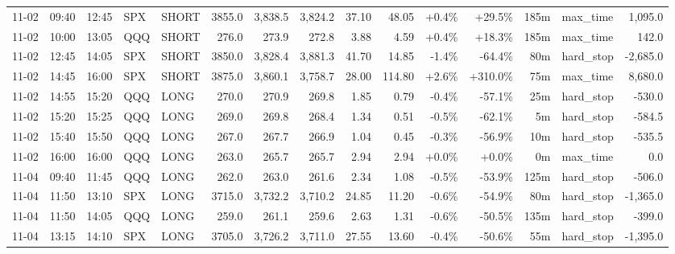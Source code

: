 \documentclass[11pt,a4paper,twoside]{article}
\begin{document}
\begin{landscape}
\begin{center}
\begin{longtable}{>{\color{txtmain}}l l l l l r r r r r r r r >{\color{txtmain}}l r}
11-02 & 09:40 & 12:45 & SPX & SHORT & 3855.0 & 3,838.5 & 3,824.2 & 37.10 & 48.05 & \textcolor{wingreen}{+0.4\%} & \textcolor{wingreen}{+29.5\%} & 185m & max\_time & \textcolor{wingreen}{1,095.0} \\
11-02 & 10:00 & 13:05 & QQQ & SHORT & 276.0 & 273.9 & 272.8 & 3.88 & 4.59 & \textcolor{wingreen}{+0.4\%} & \textcolor{wingreen}{+18.3\%} & 185m & max\_time & \textcolor{wingreen}{142.0} \\
11-02 & 12:45 & 14:05 & SPX & SHORT & 3850.0 & 3,828.4 & 3,881.3 & 41.70 & 14.85 & \textcolor{lossred}{-1.4\%} & \textcolor{lossred}{-64.4\%} & 80m & hard\_stop & \textcolor{lossred}{-2,685.0} \\
11-02 & 14:45 & 16:00 & SPX & SHORT & 3875.0 & 3,860.1 & 3,758.7 & 28.00 & 114.80 & \textcolor{wingreen}{+2.6\%} & \textcolor{wingreen}{+310.0\%} & 75m & max\_time & \textcolor{wingreen}{8,680.0} \\
11-02 & 14:55 & 15:20 & QQQ & LONG & 270.0 & 270.9 & 269.8 & 1.85 & 0.79 & \textcolor{lossred}{-0.4\%} & \textcolor{lossred}{-57.1\%} & 25m & hard\_stop & \textcolor{lossred}{-530.0} \\
11-02 & 15:20 & 15:25 & QQQ & LONG & 269.0 & 269.8 & 268.4 & 1.34 & 0.51 & \textcolor{lossred}{-0.5\%} & \textcolor{lossred}{-62.1\%} & 5m & hard\_stop & \textcolor{lossred}{-584.5} \\
11-02 & 15:40 & 15:50 & QQQ & LONG & 267.0 & 267.7 & 266.9 & 1.04 & 0.45 & \textcolor{lossred}{-0.3\%} & \textcolor{lossred}{-56.9\%} & 10m & hard\_stop & \textcolor{lossred}{-535.5} \\
11-02 & 16:00 & 16:00 & QQQ & LONG & 263.0 & 265.7 & 265.7 & 2.94 & 2.94 & \textcolor{wingreen}{+0.0\%} & \textcolor{wingreen}{+0.0\%} & 0m & max\_time & \textcolor{wingreen}{0.0} \\
11-04 & 09:40 & 11:45 & QQQ & LONG & 262.0 & 263.0 & 261.6 & 2.34 & 1.08 & \textcolor{lossred}{-0.5\%} & \textcolor{lossred}{-53.9\%} & 125m & hard\_stop & \textcolor{lossred}{-506.0} \\
11-04 & 11:50 & 13:10 & SPX & LONG & 3715.0 & 3,732.2 & 3,710.2 & 24.85 & 11.20 & \textcolor{lossred}{-0.6\%} & \textcolor{lossred}{-54.9\%} & 80m & hard\_stop & \textcolor{lossred}{-1,365.0} \\
11-04 & 11:50 & 14:05 & QQQ & LONG & 259.0 & 261.1 & 259.6 & 2.63 & 1.31 & \textcolor{lossred}{-0.6\%} & \textcolor{lossred}{-50.5\%} & 135m & hard\_stop & \textcolor{lossred}{-399.0} \\
11-04 & 13:15 & 14:10 & SPX & LONG & 3705.0 & 3,726.2 & 3,711.0 & 27.55 & 13.60 & \textcolor{lossred}{-0.4\%} & \textcolor{lossred}{-50.6\%} & 55m & hard\_stop & \textcolor{lossred}{-1,395.0} \\

\end{longtable}
\end{center}
\end{landscape}
\end{document}
